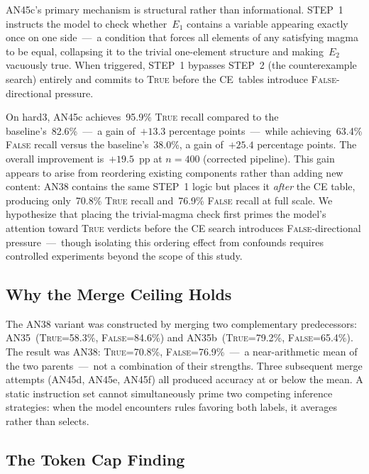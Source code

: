 \documentclass[11pt]{article}
\begin{document}
AN45c's primary mechanism is structural rather than informational.
STEP~1 instructs the model to check whether~$E_1$ contains a variable
appearing exactly once on one side~---~a condition that forces all
elements of any satisfying magma to be equal, collapsing it to the
trivial one-element structure and making~$E_2$ vacuously true. When
triggered, STEP~1 bypasses STEP~2 (the counterexample search) entirely
and commits to \textsc{True} before the CE~tables introduce
\textsc{False}-directional pressure.

On hard3, AN45c achieves~95.9\% \textsc{True} recall compared to the
baseline's~82.6\%~---~a gain of~$+13.3$ percentage points~---~while
achieving~63.4\% \textsc{False} recall versus the baseline's~38.0\%,
a gain of~$+25.4$ percentage points.
The overall improvement is~$+19.5$~pp at $n=400$ (corrected pipeline).
This gain appears to arise from reordering existing components rather
than adding new content: AN38 contains the same STEP~1 logic but places
it \emph{after} the CE table, producing only~70.8\% \textsc{True}
recall and~76.9\% \textsc{False} recall at full scale. We hypothesize
that placing the trivial-magma check first primes the model's attention
toward \textsc{True} verdicts before the CE search introduces
\textsc{False}-directional pressure~---~though isolating this ordering
effect from confounds requires controlled experiments beyond the scope
of this study.

\subsection{Why the Merge Ceiling Holds}

The AN38 variant was constructed by merging two complementary
predecessors: AN35~(\textsc{True}=58.3\%, \textsc{False}=84.6\%) and
AN35b~(\textsc{True}=79.2\%, \textsc{False}=65.4\%). The result was
AN38: \textsc{True}=70.8\%, \textsc{False}=76.9\%~---~a near-arithmetic
mean of the two parents~---~not a combination of their strengths. Three
subsequent merge attempts (AN45d, AN45e, AN45f) all produced accuracy
at or below the mean. A static instruction set cannot simultaneously
prime two competing inference strategies: when the model encounters
rules favoring both labels, it averages rather than selects.

\subsection{The Token Cap Finding}
\end{document}
